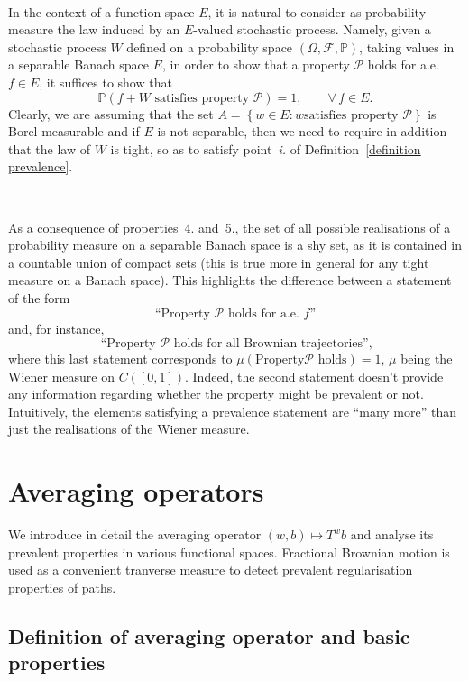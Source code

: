 \documentclass[10pt]{article}
\newcommand{\tmtextit}[1]{{\itshape{#1}}}
\begin{document}
\

In the context of a function space $E$, it is natural to consider as
probability measure the law induced by an $E$\mbox{-}valued stochastic
process. Namely, given a stochastic process $W$ defined on a probability space
$(\Omega, \mathcal{F}, \mathbb{P})$, taking values in a separable Banach space
$E$, in order to show that a property $\mathcal{P}$ holds for a.e. $f \in E$,
it suffices to show that
\[ \mathbb{P} \left( \text{$f + W$ satisfies property $\mathcal{P}$} \right) =
   1, \qquad \forall \, f \in E. \]
Clearly, we are assuming that the set $A = \left\{ w \in E : \text{$w$
satisfies property $\mathcal{P}$} \right\}$ is Borel measurable and if $E$ is
not separable, then we need to require in addition that the law of $W$ is
tight, so as to satisfy point~\tmtextit{i.} of Definition~\ref{definition
prevalence}.

\

As a consequence of properties~4. and~5., the set of all possible
realisations of a probability measure on a separable Banach space is a shy
set, as it is contained in a countable union of compact sets (this is true
more in general for any tight measure on a Banach space). This highlights the
difference between a statement of the form
\[ \text{``Property $\mathcal{P}$ holds for a.e. $f$''} \]
and, for instance,
\[ \text{ ``Property $\mathcal{P}$ holds for all Brownian trajectories''}, \]
where this last statement corresponds to $\mu \left( \text{Property
$\mathcal{P}$ holds} \right) = 1$, $\mu$ being the Wiener measure on $C ([0,
1])$. Indeed, the second statement doesn't provide any information regarding
whether the property might be prevalent or not. Intuitively, the elements
satisfying a prevalence statement are ``many more'' than just the realisations
of the Wiener measure.

\section{Averaging operators}\label{sec3}

We introduce in detail the averaging operator $(w, b) \mapsto T^w b$ and
analyse its prevalent properties in various functional spaces. Fractional
Brownian motion is used as a convenient tranverse measure to detect prevalent
regularisation properties of paths.

\subsection{Definition of averaging operator and basic
properties}\label{sec3.1}
\end{document}

